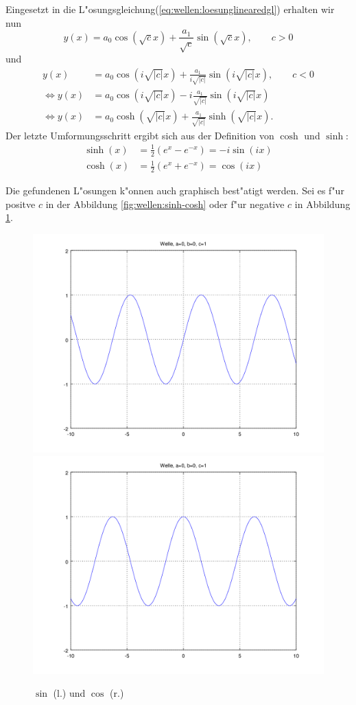 Eingesetzt in die L"osungsgleichung(\ref{eq:wellen:loesunglinearedgl}) erhalten 
wir nun
\begin{equation*}
	y(x) = a_0 \cos(\sqrt{c}x) + \frac{a_1}{\sqrt{c}} \sin(\sqrt{c}x), \qquad c 
	> 0
\end{equation*}
und
\begin{equation}
	\begin{split}
		y(x) &= a_0 \cos(i\sqrt{|c|}x) + 
		\frac{a_1}{i\sqrt{|c|}}\sin(i\sqrt{|c|}x), \qquad c < 0\\
		\Leftrightarrow
		y(x) &= a_0 \cos(i\sqrt{|c|}x) - 
		i\frac{a_1}{\sqrt{|c|}}\sin(i\sqrt{|c|}x)\\
		\Leftrightarrow
		y(x) &= a_0 \cosh(\sqrt{|c|}x) + 
		\frac{a_1}{\sqrt{|c|}}\sinh(\sqrt{|c|}x).
	\end{split}	
\end{equation}
Der letzte Umformungsschritt ergibt sich aus der Definition von $\cosh$ und 
$\sinh$:
\begin{equation*}
	\begin{split}
		\sinh(x) &= \frac{1}{2} (e^x - e^{-x}) = -i \sin(ix)\\
		\cosh(x) &= \frac{1}{2} (e^x + e^{-x}) = \cos (ix)
	\end{split}
\end{equation*}

Die gefundenen L"osungen k"onnen auch graphisch best"atigt werden. Sei es f"ur 
positve $c$ in der Abbildung \ref{fig:wellen:sinh-cosh} oder f"ur negative $c$ 
in Abbildung \ref{fig:wellen:sin-cos}.

\begin{figure}
	\includegraphics[width=0.5\hsize]{./wellen/images/basicfunctions/sin.png}
	\includegraphics[width=0.5\hsize]{./wellen/images/basicfunctions/cos.png}
	\caption{$\sin$ (l.) und $\cos$ (r.)}
	\label{fig:wellen:sin-cos}
\end{figure}

